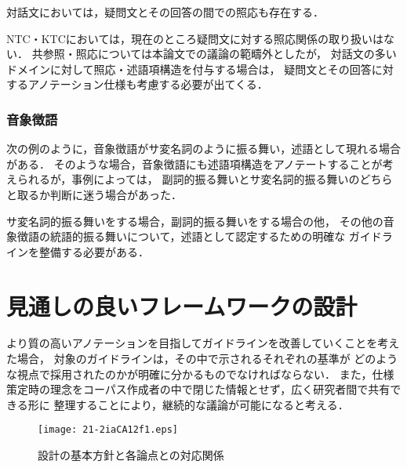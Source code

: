 \documentclass[japanese]{jnlp_1.4}
\begin{document}
対話文においては，疑問文とその回答の間での照応も存在する．

NTC・KTCにおいては，現在のところ疑問文に対する照応関係の取り扱いはない．
共参照・照応については本論文での議論の範疇外としたが，
対話文の多いドメインに対して照応・述語項構造を付与する場合は，
疑問文とその回答に対するアノテーション仕様も考慮する必要が出てくる．


\subsubsection{音象徴語}
\label{sec:sound-symbol}

次の例のように，音象徴語がサ変名詞のように振る舞い，述語として現れる場合がある．
そのような場合，音象徴語にも述語項構造をアノテートすることが考えられるが，事例によっては，
副詞的振る舞いとサ変名詞的振る舞いのどちらと取るか判断に迷う場合があった．

サ変名詞的振る舞いをする場合，副詞的振る舞いをする場合の他，
その他の音象徴語の統語的振る舞いについて，述語として認定するための明確な
ガイドラインを整備する必要がある．


\section{見通しの良いフレームワークの設計}
\label{sec:framework}

より質の高いアノテーションを目指してガイドラインを改善していくことを考えた場合，
対象のガイドラインは，その中で示されるそれぞれの基準が
どのような視点で採用されたのかが明確に分かるものでなければならない．
また，仕様策定時の理念をコーパス作成者の中で閉じた情報とせず，広く研究者間で共有できる形に
整理することにより，継続的な議論が可能になると考える．

\begin{figure}[t]
\begin{center}
\texttt{[image: 21-2iaCA12f1.eps]}
\end{center}
\caption{設計の基本方針と各論点との対応関係}
\label{fig:principles}
\end{figure}
\end{document}
